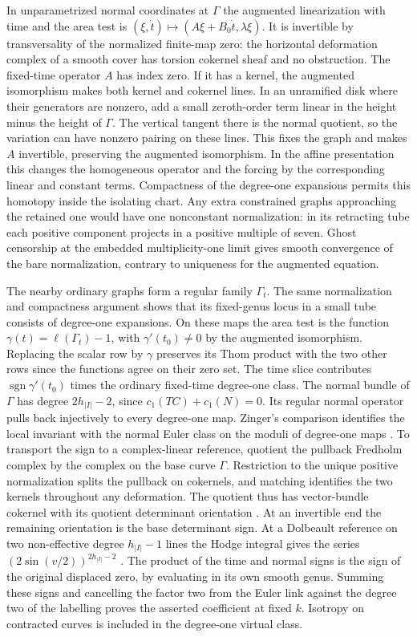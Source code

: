 In unparametrized normal coordinates at $\Gamma$ the augmented
linearization with time and the area test is
$(\xi,\dot t)\mapsto(A\xi+B_0\dot t,\lambda\xi)$.
It is invertible by transversality of the normalized finite-map
zero: the horizontal deformation complex of a smooth cover has
torsion cokernel sheaf and no obstruction. The fixed-time operator
$A$ has index zero. If it has a kernel, the augmented isomorphism
makes both kernel and cokernel lines. In an unramified disk where
their generators are nonzero, add a small zeroth-order term linear in
the height minus the height of $\Gamma$. The vertical tangent there
is the normal quotient, so the variation can have nonzero pairing
on these lines. This fixes the graph and makes $A$ invertible,
preserving the augmented isomorphism. In the affine presentation this
changes the homogeneous operator and the forcing by the corresponding
linear and constant terms. Compactness of the degree-one expansions
permits this homotopy inside the isolating chart. Any extra constrained
graphs approaching the retained one would have one nonconstant
normalization: in its retracting tube each positive component projects
in a positive multiple of seven. Ghost censorship at the embedded
multiplicity-one limit gives smooth convergence of the bare
normalization, contrary to uniqueness for the augmented equation.

The nearby ordinary graphs form a regular family $\Gamma_t$.
The same normalization and compactness argument shows that its
fixed-genus locus in a small tube consists of degree-one expansions.
On these maps the area test is the function
$\gamma(t)=\ell(\Gamma_t)-1$, with $\gamma'(t_0)\ne0$ by the
augmented isomorphism. Replacing the scalar row by $\gamma$ preserves
its Thom product with the two other rows since the functions agree
on their zero set. The time slice contributes
$\operatorname{sgn}\gamma'(t_0)$ times the ordinary fixed-time
degree-one class. The normal bundle of $\Gamma$ has degree
$2h_{|I|}-2$, since $c_1(TC)+c_1(N)=0$. Its regular normal
operator pulls back injectively to every degree-one map. Zinger's
comparison identifies the local invariant with the normal Euler class
on the moduli of degree-one maps \cite[Theorem~1.2]{zinger}.
To transport the sign to a complex-linear reference, quotient the
pullback Fredholm complex by the complex on the base curve $\Gamma$.
Restriction to the unique positive normalization splits the pullback
on cokernels, and matching identifies the two kernels throughout any
deformation. The quotient thus has vector-bundle cokernel with its
quotient determinant orientation \cite[Appendix~B]{bai}.
At an invertible end the remaining orientation is the base determinant
sign. At a Dolbeault reference on two non-effective degree
$h_{|I|}-1$ lines the Hodge integral gives the series
$(2\sin(v/2))^{2h_{|I|}-2}$ \cite[Theorem~2]{pandhodge}.
The product of the time and normal signs is the sign of the original
displaced zero, by evaluating in its own smooth genus. Summing these
signs and cancelling the factor two from the Euler link against the
degree two of the labelling proves the asserted coefficient at fixed
$k$. Isotropy on contracted curves is included in the degree-one
virtual class.

